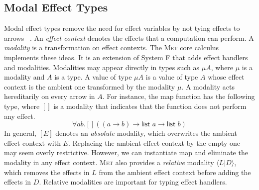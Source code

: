 \documentclass[sigplan, nonacm, natbib = false, review, screen]{acmart}
\newcommand{\Met}{\textsc{Met}\xspace}
\newcommand{\todobox}[3]{{\todo[color=#1!20,bordercolor=#1!80]{%
  \begin{spacing}{0.9}\footnotesize\textbf{#2:} #3\end{spacing}}}}
\newcommand{\sam}[1]{\todobox{yellow}{Sam}{#1}}
\begin{document}
%


\subsection{Modal Effect Types}


Modal effect types remove the need for effect variables by not tying
effects to arrows ~\cite{tang2025modal, tang2026modal}.
%
An \emph{effect context} denotes the effects that a computation can perform.
%
A \emph{modality} is a transformation on effect contexts.
%
%
The \Met core calculus implements these ideas. It is an extension of System F
that adds effect handlers and modalities.
%
Modalities may appear directly in types such as $\mu A$, where $\mu$ is a
modality and $A$ is a type. A value of type $\mu A$ is a value of type $A$ whose
effect context is the ambient one transformed by the modality $\mu$. A modality
acts hereditarily on every arrow in $A$.
%
For instance, the \textsf{map} function has the following type, where $[]$ is a
modality that indicates that the function does not perform any effect.
\[
  \forall a b . []((a \to b) \to \textsf{list } a \to \textsf{list } b)
\]
In general, $[E]$ denotes an \emph{absolute} modality, which overwrites the
ambient effect context with $E$.
%
Replacing the ambient effect context by the empty one may seem overly
restrictive. However, we can instantiate \textsf{map} and eliminate the modality
in any effect context.
%
%
%
%
%
\Met also provides a \emph{relative} modality $\langle L|D\rangle$, which
removes the effects in $L$ from the ambient effect context before adding the
effects in $D$. Relative modalities are important for typing effect handlers.
\end{document}
